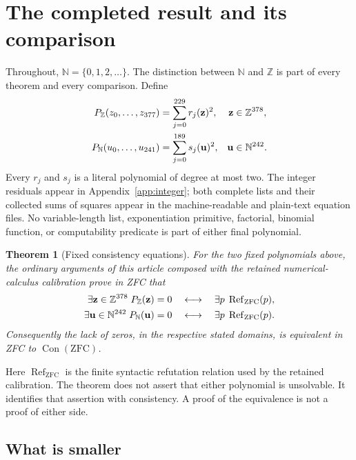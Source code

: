\documentclass[11pt]{article}
\newtheorem{theorem}{Theorem}[section]
\theoremstyle{remark}\newtheorem{remark}[theorem]{Remark}
\newcommand{\N}{\mathbb N}\newcommand{\Z}{\mathbb Z}
\newcommand{\Con}{\operatorname{Con}}
\newcommand{\Refut}{\operatorname{Ref}}
\begin{document}
\section{The completed result and its comparison}
\label{sec:result}

Throughout, $\N=\{0,1,2,\ldots\}$. The distinction between $\N$ and $\Z$ is part of every theorem and every comparison. Define
\begin{align}
 P_{\Z}(z_0,\ldots,z_{\IntLastVar})
   &=\sum_{j=0}^{\IntLastRow}r_j(\mathbf z)^2,
   &\mathbf z&\in\Z^{\IntVars},\label{eq:mainZ}\\
 P_{\N}(u_0,\ldots,u_{\NatLastVar})
   &=\sum_{j=0}^{\NatLastRow}s_j(\mathbf u)^2,
   &\mathbf u&\in\N^{\NatVars}.\label{eq:mainN}
\end{align}
Every $r_j$ and $s_j$ is a literal polynomial of degree at most two. The integer residuals appear in Appendix~\ref{app:integer}; both complete lists and their collected sums of squares appear in the machine-readable and plain-text equation files. No variable-length list, exponentiation primitive, factorial, binomial function, or computability predicate is part of either final polynomial.

\begin{theorem}[Fixed consistency equations]\label{thm:consistency}
For the two fixed polynomials above, the ordinary arguments of this article composed with the retained numerical-calculus calibration prove in ZFC that
\begin{align*}
 \exists\mathbf z\in\Z^{\IntVars}\;P_{\Z}(\mathbf z)=0
  &\quad\longleftrightarrow\quad \exists p\;\Refut_{\mathrm{ZFC}}(p),\\
 \exists\mathbf u\in\N^{\NatVars}\;P_{\N}(\mathbf u)=0
  &\quad\longleftrightarrow\quad \exists p\;\Refut_{\mathrm{ZFC}}(p).
\end{align*}
Consequently the lack of zeros, in the respective stated domains, is equivalent in ZFC to $\Con(\mathrm{ZFC})$.
\end{theorem}

Here $\Refut_{\mathrm{ZFC}}$ is the finite syntactic refutation relation used by the retained calibration. The theorem does not assert that either polynomial is unsolvable. It identifies that assertion with consistency. A proof of the equivalence is not a proof of either side.

\subsection{What is smaller}
\end{document}
